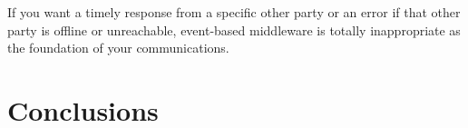 \documentclass{acm_proc_article-sp}
\begin{document}
If you want a timely response from a specific other party or an error if that other party is offline or unreachable, event-based middleware is totally inappropriate as the foundation of your communications.



\section{Conclusions}
\label{sec:conclusion}





\balancecolumns
\end{document}
